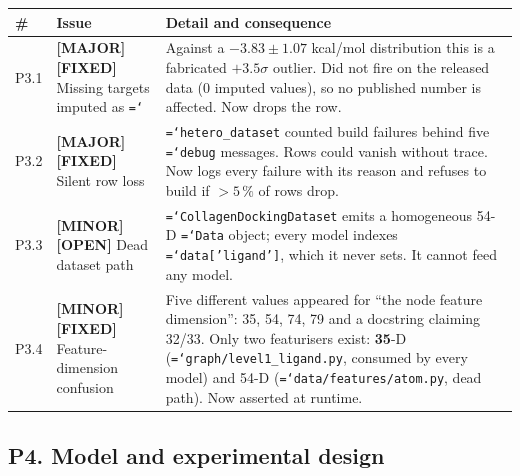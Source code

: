\documentclass[11pt,a4paper]{article}
\newcommand{\ok}[1]{\textcolor{okgreen}{#1}}
\newcommand{\bad}[1]{\textcolor{badred}{#1}}
\newcommand{\warn}[1]{\textcolor{warnamber}{#1}}
\newcommand{\code}[1]{\texttt{\small\hyphenchar\font=`\-\relax #1}}
\newcommand{\SMAJOR}{\warn{\textbf{[MAJOR]}}}
\newcommand{\SMINOR}{\textbf{[MINOR]}}
\newcommand{\SFIXED}{\ok{\textbf{[FIXED]}}}
\newcommand{\SOPEN}{\bad{\textbf{[OPEN]}}}
\begin{document}
\begin{longtable}{@{}L{0.6cm}L{5.2cm}L{8.6cm}@{}}
\toprule
\textbf{\#} & \textbf{Issue} & \textbf{Detail and consequence} \\
\midrule
\endhead
P3.1 & \SMAJOR{} \SFIXED{} Missing targets imputed as \code{0.0} &
  Against a $-3.83 \pm 1.07$ kcal/mol distribution this is a fabricated
  $+3.5\sigma$ outlier. \ok{Did not fire on the released data (0 imputed
  values), so no published number is affected.} Now drops the row. \\
P3.2 & \SMAJOR{} \SFIXED{} Silent row loss &
  \code{hetero\_dataset} counted build failures behind five \code{debug}
  messages. Rows could vanish without trace. Now logs every failure with its
  reason and refuses to build if $>5\,\%$ of rows drop. \\
P3.3 & \SMINOR{} \SOPEN{} Dead dataset path &
  \code{CollagenDockingDataset} emits a homogeneous 54-D \code{Data} object;
  every model indexes \code{data['ligand']}, which it never sets. It cannot
  feed any model. \\
P3.4 & \SMINOR{} \SFIXED{} Feature-dimension confusion &
  Five different values appeared for ``the node feature dimension'': 35, 54,
  74, 79 and a docstring claiming 32/33. Only two featurisers exist:
  \textbf{35}-D (\code{graph/level1\_ligand.py}, consumed by every model) and
  54-D (\code{data/features/atom.py}, dead path). Now asserted at runtime. \\
\bottomrule
\end{longtable}

\subsection{P4. Model and experimental design}
\end{document}
